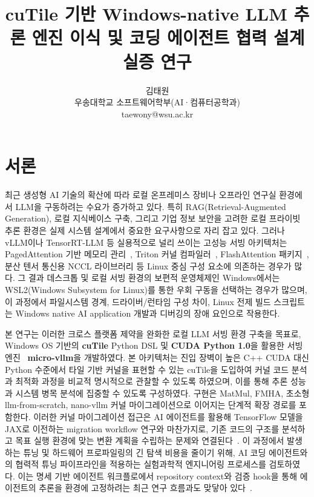 \documentclass{kcc}            %
\title{cuTile 기반 Windows-native LLM 추론 엔진 이식 및 코딩 에이전트 협력 설계 실증 연구}
\author{
김태원\\
우송대학교 소프트웨어학부(AI·컴퓨터공학과)\\
taewony@wsu.ac.kr
}
\begin{document}
\maketitle

\section{서론}
최근 생성형 AI 기술의 확산에 따라 로컬 온프레미스 장비나 오프라인 연구실
환경에서 LLM을 구동하려는 수요가 증가하고 있다. 특히
RAG(Retrieval-Augmented Generation), 로컬 지식베이스 구축, 그리고 기업
정보 보안을 고려한 로컬 프라이빗 추론 환경은 실제 시스템 설계에서 중요한
요구사항으로 자리 잡고 있다. 그러나 vLLM이나 TensorRT-LLM 등 실용적으로
널리 쓰이는 고성능 서빙 아키텍처는 PagedAttention 기반 메모리 관리~\cite{pagedattention},
Triton 커널 컴파일러~\cite{triton}, FlashAttention 패키지~\cite{flashattention}, 분산 텐서 통신용 NCCL
라이브러리 등 Linux 중심 구성 요소에 의존하는 경우가 많다. 그 결과
데스크톱 및 로컬 서빙 환경의 보편적 운영체제인 Windows에서는
WSL2(Windows Subsystem for Linux)를 통한 우회 구동을 선택하는 경우가
많으며, 이 과정에서 파일시스템 경계, 드라이버/런타임 구성 차이, Linux
전제 빌드 스크립트는 Windows native AI application 개발과 디버깅의 장애
요인으로 작용한다.

본 연구는 이러한 크로스 플랫폼 제약을 완화한 로컬 LLM 서빙 환경 구축을
목표로, Windows OS 기반의 \textbf{cuTile} Python DSL 및
\textbf{CUDA Python 1.0}을 활용한 서빙 엔진~\cite{nvidia-cuda133,nvidia-cutile}
\textbf{micro-vllm}을 개발하였다. 본 아키텍처는 진입 장벽이 높은 C++
CUDA 대신 Python 수준에서 타일 기반 커널을 표현할 수 있는 cuTile을
도입하여 커널 코드 분석과 최적화 과정을 비교적 명시적으로 관찰할 수
있도록 하였으며, 이를 통해 추론 성능과 시스템 병목 분석에 집중할 수
있도록 구성하였다. 구현은 MatMul, FMHA, 초소형 llm-from-scratch,
nano-vllm 커널 마이그레이션으로 이어지는 단계적 확장 경로를 포함한다.
이러한 커널 마이그레이션 접근은 AI 에이전트를 활용해 TensorFlow 모델을
JAX로 이전하는 migration workflow 연구와 마찬가지로, 기존 코드의 구조를
분석하고 목표 실행 환경에 맞는 변환 계획을 수립하는 문제와 연결된다~\cite{ai-migration}.
이 과정에서 발생하는 튜닝 및 하드웨어 프로파일링의 긴 탐색 비용을 줄이기
위해, AI 코딩 에이전트와의 협력적 튜닝 파이프라인을 적용하는
실험과학적 엔지니어링 프로세스를 검토하였다. 이는 명세 기반 에이전트
워크플로에서 repository context와 검증 hook을 통해 에이전트의 추론을
환경에 고정하려는 최근 연구 흐름과도 맞닿아 있다~\cite{speckit}.
\end{document}
